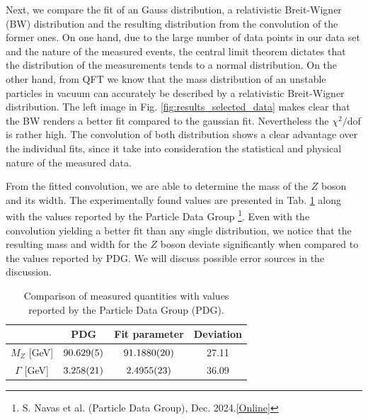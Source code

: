 \documentclass[11 pt]{article}
\begin{document}
Next, we compare the fit of an Gauss distribution, a relativistic Breit-Wigner (BW) distribution and the resulting distribution from the convolution of the former ones. On one hand, due to the large number of data points in our data set and the nature of the measured events, the central limit theorem dictates that the distribution of the measurements tends to a normal distribution. On the other hand, from QFT we know that the mass distribution of an unstable particles in vacuum can accurately be described by a relativistic Breit-Wigner distribution. The left image in Fig. \ref{fig:results_selected_data} makes clear that the BW renders a better fit compared to the gaussian fit. Nevertheless the $\chi^2/$dof is rather high. The convolution of both distribution shows a clear advantage over the individual fits, since it take into consideration the statistical and physical nature of the measured data. 

From the fitted convolution, we are able to determine the mass of the $Z$ boson and its width. The experimentally found values are presented in Tab. \ref{tab:results_literatur} along with the values reported by the Particle Data Group \footnote{S. Navas et al. (Particle Data Group), Dec. 2024.\href{https://pdglive.lbl.gov/Particle.action?node=S044&init=0}{[Online]}}. Even with the convolution yielding a better fit than any single distribution, we notice that the resulting mass and width for the $Z$ boson deviate significantly when compared to the values reported by PDG. We will discuss possible error sources in the discussion.

\begin{table}[!htbp]
 \begin{center}
  \caption{Comparison of measured quantities with values reported by the Particle Data Group (PDG).}
  \label{tab:results_literatur}
  \begin{tabular}{|c||c|c|c|}
  \hline
		  										& PDG 					& Fit parameter  & Deviation\\
		  										\hline
		  										\hline
  $M_Z$ [\unit{\giga\electronvolt}] & $\num{90.629\pm 0.005}$	& $\num{91.1880\pm 0.0020}$ & 27.11\\
  $\Gamma$ [\unit{\giga\electronvolt}]& $\num{3.258\pm 0.021}$ & $\num{2.4955\pm 0.0023}$&36.09\\
  \hline

\hline 
  \end{tabular}
 \end{center}
\end{table}
\end{document}
